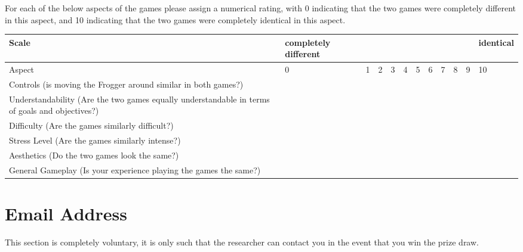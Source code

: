\documentclass[12pt, a4paper]{report}
\begin{document}
For each of the below aspects of the games please assign a numerical rating, with 0 indicating that the two games were completely different in this aspect, and 10 indicating that the two games were completely identical in this aspect.

\begin{table}[]
  \begin{tabular}{p{}|p{}|p{}|p{}|p{}|p{}|p{}|p{}|p{}|p{}|p{}|p{}}
    Scale            & completely different & & & & & & & & & & identical \\
    \hline
    Aspect            & 0 & 1 & 2 & 3 & 4 & 5 & 6 & 7 & 8 & 9 & 10 \\
    \hline
    Controls (is moving the Frogger around similar in both games?)         & & & & & & & & & & & \\
    \hline
    Understandability (Are the two games equally understandable in terms of goals and objectives?) & & & & & & & & & & & \\
    \hline
    Difficulty (Are the games similarly difficult?)       & & & & & & & & & & & \\
    \hline
    Stress Level (Are the games similarly intense?)     & & & & & & & & & & & \\
    \hline
    Aesthetics (Do the two games look the same?)       & & & & & & & & & & & \\
    \hline
    General Gameplay (Is your experience playing the games the same?)  & & & & & & & & & & & \\
  \end{tabular}
\end{table}

\section*{Email Address}

This section is completely voluntary, it is only such that the researcher can contact you in the event that you win the prize draw.
\end{document}
